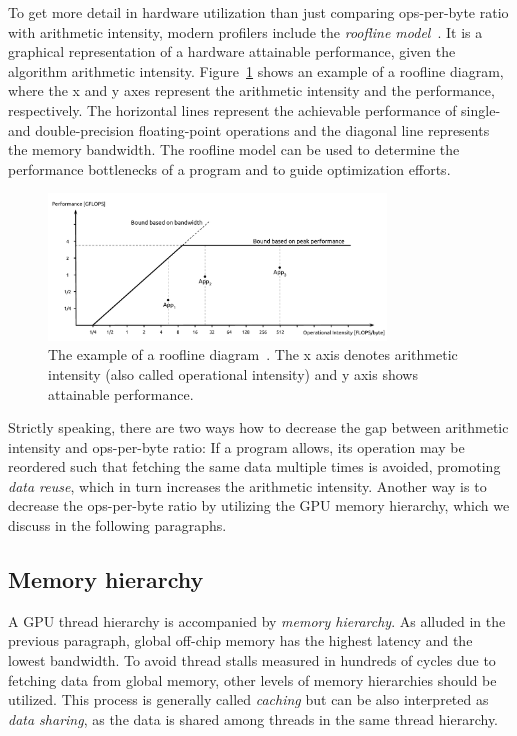To get more detail in hardware utilization than just comparing ops-per-byte ratio with arithmetic intensity, modern profilers include the \emph{roofline model}~\cite{williams2009roofline}. It is a graphical representation of a hardware attainable performance, given the algorithm arithmetic intensity. Figure~\ref{fig:roof} shows an example of a roofline diagram, where the x and y axes represent the arithmetic intensity and the performance, respectively. The horizontal lines represent the achievable performance of single- and double-precision floating-point operations and the diagonal line represents the memory bandwidth. The roofline model can be used to determine the performance bottlenecks of a program and to guide optimization efforts.

\begin{figure}
    \centering
    \includegraphics[width=0.8\textwidth]{img/Example_of_a_Roofline_model.pdf}
    \caption{The example of a roofline diagram~\cite{wiki:Roofline_model}. The x axis denotes arithmetic intensity (also called operational intensity) and y axis shows attainable performance.}
    \label{fig:roof}
\end{figure}

Strictly speaking, there are two ways how to decrease the gap between arithmetic intensity and ops-per-byte ratio: If a program allows, its operation may be reordered such that fetching the same data multiple times is avoided, promoting \emph{data reuse}, which in turn increases the arithmetic intensity. Another way is to decrease the ops-per-byte ratio by utilizing the GPU memory hierarchy, which we discuss in the following paragraphs.

\subsection{Memory hierarchy}
\label{sec:memory_hier}

A GPU thread hierarchy is accompanied by \emph{memory hierarchy}. As alluded in the previous paragraph, global off-chip memory has the highest latency and the lowest bandwidth. To avoid thread stalls measured in hundreds of cycles due to fetching data from global memory, other levels of memory hierarchies should be utilized. This process is generally called \emph{caching} but can be also interpreted as \emph{data sharing}, as the data is shared among threads in the same thread hierarchy.

